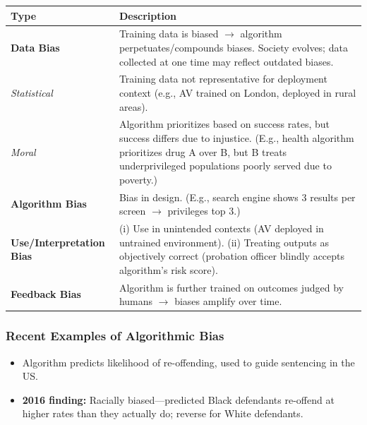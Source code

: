 \begin{center}
\renewcommand{\arraystretch}{1.3}
\begin{tabular}{@{} l p{9cm} @{}}
\toprule
\textbf{Type} & \textbf{Description} \\
\midrule
\textbf{Data Bias} & Training data is biased $\to$ algorithm perpetuates/compounds biases. Society evolves; data collected at one time may reflect outdated biases. \\
\quad \textit{Statistical} & Training data not representative for deployment context (e.g., AV trained on London, deployed in rural areas). \\
\quad \textit{Moral} & Algorithm prioritizes based on success rates, but success differs due to injustice. (E.g., health algorithm prioritizes drug A over B, but B treats underprivileged populations poorly served due to poverty.) \\
\textbf{Algorithm Bias} & Bias in design. (E.g., search engine shows 3 results per screen $\to$ privileges top 3.) \\
\textbf{Use/Interpretation Bias} & (i) Use in unintended contexts (AV deployed in untrained environment). (ii) Treating outputs as objectively correct (probation officer blindly accepts algorithm's risk score). \\
\textbf{Feedback Bias} & Algorithm is further trained on outcomes judged by humans $\to$ biases amplify over time. \\
\bottomrule
\end{tabular}
\end{center}

\bigseparator

\subsubsection{Recent Examples of Algorithmic Bias}

\begin{exbox}
\begin{itemize}
  \item Algorithm predicts likelihood of re-offending, used to guide sentencing in the US.
  \item \textbf{2016 finding:} Racially biased---predicted Black defendants re-offend at higher rates than they actually do; reverse for White defendants.
\end{itemize}
\end{exbox}


